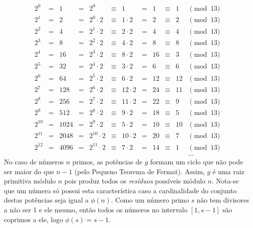 \documentclass{../sftex/sftex}
\begin{document}
\begin{itemize}
\begin{equation*}
\begin{aligned}
2^0    &=& 1    &=& 2^0            &\equiv& 1          &=& 1  &\equiv& 1  &
\pmod{13} \\
2^1    &=& 2    &=& 2^0    \cdot 2 &\equiv& 1  \cdot 2 &=& 2  &\equiv& 2  &
\pmod{13} \\
2^2    &=& 4    &=& 2^1    \cdot 2 &\equiv& 2  \cdot 2 &=& 4  &\equiv& 4  &
\pmod{13} \\
2^3    &=& 8    &=& 2^2    \cdot 2 &\equiv& 4  \cdot 2 &=& 8  &\equiv& 8  &
\pmod{13} \\
2^4    &=& 16   &=& 2^3    \cdot 2 &\equiv& 8  \cdot 2 &=& 16 &\equiv& 3  &
\pmod{13} \\
2^5    &=& 32   &=& 2^4    \cdot 2 &\equiv& 3  \cdot 2 &=& 6  &\equiv& 6  &
\pmod{13} \\
2^6    &=& 64   &=& 2^5    \cdot 2 &\equiv& 6  \cdot 2 &=& 12 &\equiv& 12 &
\pmod{13} \\
2^7    &=& 128  &=& 2^6    \cdot 2 &\equiv& 12 \cdot 2 &=& 24 &\equiv& 11 &
\pmod{13} \\
2^8    &=& 256  &=& 2^7    \cdot 2 &\equiv& 11 \cdot 2 &=& 22 &\equiv& 9  &
\pmod{13} \\
2^9    &=& 512  &=& 2^8    \cdot 2 &\equiv& 9  \cdot 2 &=& 18 &\equiv& 5  &
\pmod{13} \\
2^{10} &=& 1024 &=& 2^9    \cdot 2 &\equiv& 5  \cdot 2 &=& 10 &\equiv& 10 &
\pmod{13} \\
2^{11} &=& 2048 &=& 2^{10} \cdot 2 &\equiv& 10 \cdot 2 &=& 20 &\equiv& 7  &
\pmod{13} \\
2^{12} &=& 4096 &=& 2^{11} \cdot 2 &\equiv& 7  \cdot 2 &=& 14 &\equiv& 1  &
\pmod{13} \\
&&&&&&&&&&& \dots
\end{aligned}
\end{equation*}
No caso de números $n$ primos, as potências de $g$ formam um ciclo que não pode
ser maior do que $n - 1$ (pelo Pequeno Teorema de Fermat). Assim, $g$ é uma raiz
primitiva módulo $n$ pois produz todos os \emph{resíduos} possíveis módulo $n$.
Nota-se que um número só possui esta característica caso a cardinalidade do
conjunto destas potências seja igual a $\phi(n)$. Como um número primo $s$ não
tem divisores a não ser 1 e ele mesmo, então todos os números no intervalo $[1,
s-1]$ são coprimos a ele, logo $\phi(s) = s - 1$.


\end{itemize}
\end{document}
